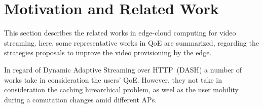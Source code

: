 \section{Motivation and Related Work}
\label{sec:related-work}

This section describes the related works in edge-cloud computing for video streaming. here, some representative works in QoE are summarized, regarding the strategies proposals to improve the video provisioning by the edge.

In regard of Dynamic Adaptive Streaming over HTTP~(DASH) a number of works take in consideration the users' QoE. However, they not take in consideration the caching hirearchical problem, as weel as the user mobility during a comutation changes amid different APs.

